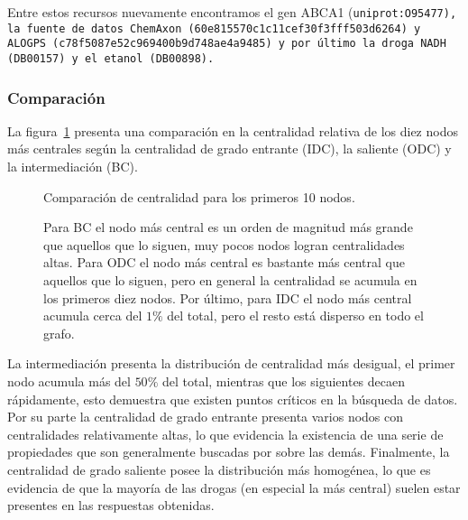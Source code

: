 Entre estos recursos nuevamente encontramos el gen ABCA1 (\tt{uniprot:O95477}),
la fuente de datos ChemAxon (\tt{60e815570c1c11cef30f3fff503d6264}) y ALOGPS
(\tt{c78f5087e52c969400b9d748ae4a9485}) y por último la droga
NADH (\tt{DB00157}) y el etanol (\tt{DB00898}).

\subsubsection{Comparación}
La figura~\ref{fig:compcent} presenta una comparación en la centralidad relativa
de los diez nodos más centrales según la centralidad de grado entrante (IDC), la
saliente (ODC) y la intermediación (BC).
\begin{figure}[h]
  \caption{Comparación de centralidad para los primeros 10 nodos.}
  \vspace{-.2cm}
  \caption*{
    Para BC el nodo más central es un orden de magnitud más grande que aquellos
    que lo siguen, muy pocos nodos logran centralidades altas.
    Para ODC el nodo más central es bastante más central que aquellos que lo
    siguen, pero en general la centralidad se acumula en los primeros diez
    nodos.
    Por último, para IDC el nodo más central acumula cerca del $1\%$ del total,
    pero el resto está disperso en todo el grafo.
  }
  \label{fig:compcent}
\end{figure}

La intermediación presenta la distribución de centralidad más desigual, el
primer nodo acumula más del $50\%$ del total, mientras que los siguientes decaen
rápidamente, esto demuestra que existen puntos críticos en la búsqueda de datos.
Por su parte la centralidad de grado entrante presenta varios nodos con
centralidades relativamente altas, lo que evidencia la existencia de una serie
de propiedades que son generalmente buscadas por sobre las demás.
Finalmente, la centralidad de grado saliente posee la distribución más
homogénea, lo que es evidencia de que la mayoría de las drogas (en especial la
más central) suelen estar presentes en las respuestas obtenidas.

